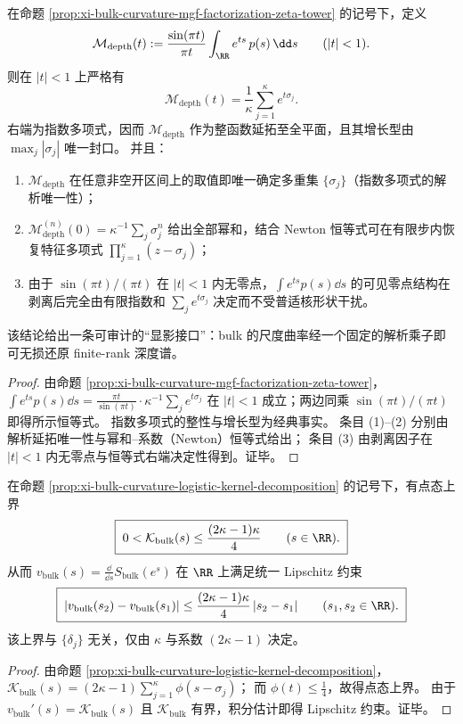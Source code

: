 \begin{proposition}\label{prop:xi-gamma-stripped-depth-spectrum-imaging}
在命题 \ref{prop:xi-bulk-curvature-mgf-factorization-zeta-tower} 的记号下，定义
\[
\mathcal M_{\mathrm{depth}}(t):=\frac{\sin(\pi t)}{\pi t}\int_{\RR}e^{ts}\,p(s)\,\dd s\qquad(|t|<1).
\]
则在 \(|t|<1\) 上严格有
\[
\boxed{\;
\mathcal M_{\mathrm{depth}}(t)=\frac{1}{\kappa}\sum_{j=1}^{\kappa}e^{t\sigma_j}.\;}
\]
右端为指数多项式，因而 \(\mathcal M_{\mathrm{depth}}\) 作为整函数延拓至全平面，且其增长型由 \(\max_j|\sigma_j|\) 唯一封口。
并且：
\begin{enumerate}
  \item \(\mathcal M_{\mathrm{depth}}\) 在任意非空开区间上的取值即唯一确定多重集 \(\{\sigma_j\}\)（指数多项式的解析唯一性）；
  \item \(\mathcal M_{\mathrm{depth}}^{(n)}(0)=\kappa^{-1}\sum_{j}\sigma_j^{n}\) 给出全部幂和，结合 Newton 恒等式可在有限步内恢复特征多项式 \(\prod_{j=1}^{\kappa}(z-\sigma_j)\)；
  \item 由于 \(\sin(\pi t)/(\pi t)\) 在 \(|t|<1\) 内无零点，\(\int e^{ts}p(s)\dd s\) 的可见零点结构在剥离后完全由有限指数和 \(\sum_j e^{t\sigma_j}\) 决定而不受普适核形状干扰。
\end{enumerate}
该结论给出一条可审计的“显影接口”：bulk 的尺度曲率经一个固定的解析乘子即可无损还原 finite-rank 深度谱。
\end{proposition}
\begin{proof}
由命题 \ref{prop:xi-bulk-curvature-mgf-factorization-zeta-tower}，
\(
\int e^{ts}p(s)\dd s=\frac{\pi t}{\sin(\pi t)}\cdot \kappa^{-1}\sum_j e^{t\sigma_j}
\)
在 \(|t|<1\) 成立；两边同乘 \(\sin(\pi t)/(\pi t)\) 即得所示恒等式。
指数多项式的整性与增长型为经典事实。
条目 (1)--(2) 分别由解析延拓唯一性与幂和--系数（Newton）恒等式给出；
条目 (3) 由剥离因子在 \(|t|<1\) 内无零点与恒等式右端决定性得到。证毕。
\end{proof}

\begin{corollary}\label{cor:xi-bulk-curvature-max-lipschitz}
在命题 \ref{prop:xi-bulk-curvature-logistic-kernel-decomposition} 的记号下，有点态上界
\[
\boxed{\;
0<\mathcal{K}_{\mathrm{bulk}}(s)\le \frac{(2\kappa-1)\kappa}{4}\qquad(s\in\RR).\;}
\]
从而 \(v_{\mathrm{bulk}}(s)=\frac{\dd}{\dd s}S_{\mathrm{bulk}}(e^s)\) 在 \(\RR\) 上满足统一 Lipschitz 约束
\[
\boxed{\;
|v_{\mathrm{bulk}}(s_2)-v_{\mathrm{bulk}}(s_1)|
\le \frac{(2\kappa-1)\kappa}{4}\,|s_2-s_1|\qquad(s_1,s_2\in\RR).\;}
\]
该上界与 \(\{\delta_j\}\) 无关，仅由 \(\kappa\) 与系数 \((2\kappa-1)\) 决定。
\end{corollary}
\begin{proof}
由命题 \ref{prop:xi-bulk-curvature-logistic-kernel-decomposition}，
\(
\mathcal{K}_{\mathrm{bulk}}(s)=(2\kappa-1)\sum_{j=1}^{\kappa}\phi(s-\sigma_j)
\)；
而 \(\phi(t)\le \tfrac14\)，故得点态上界。
由于 \(v_{\mathrm{bulk}}'(s)=\mathcal{K}_{\mathrm{bulk}}(s)\) 且 \(\mathcal{K}_{\mathrm{bulk}}\) 有界，积分估计即得 Lipschitz 约束。证毕。
\end{proof}


